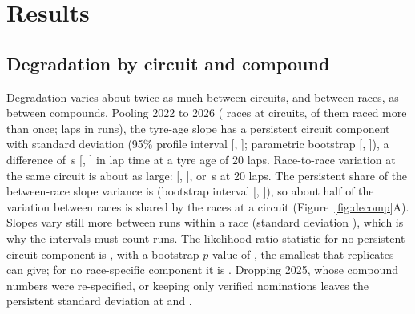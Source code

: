 \section{Results}\label{sec:results}

\subsection{Degradation by circuit and compound}\label{sec:rates}

Degradation varies about twice as much between circuits, and between races, as between compounds.
Pooling 2022 to 2026 (\PooledNEvents{} races at \PooledNCircuits{} circuits, \PooledNRepeat{} of them raced more than once; \PooledNLaps{} laps in \PooledNRuns{} runs), the tyre-age slope has a persistent circuit component with standard deviation \PersistSD\spl{} (95\% profile interval [\PersistSDLo, \PersistSDHi]; parametric bootstrap [\PersistSDBootLo, \PersistSDBootHi]), a difference of \PersistSDsPerTwenty\,s [\PersistSDsPerTwentyLo, \PersistSDsPerTwentyHi] in lap time at a tyre age of 20 laps.
Race-to-race variation at the same circuit is about as large: \EventSD\spl{} [\EventSDLo, \EventSDHi], or \EventSDsPerTwenty\,s at 20 laps.
The persistent share of the between-race slope variance is \PersistShare{} (bootstrap interval [\PersistShareBootLo, \PersistShareBootHi]), so about half of the variation between races is shared by the races at a circuit (Figure~\ref{fig:decomp}A).
Slopes vary still more between runs within a race (standard deviation \RunSlopeSD\spl), which is why the intervals must count runs.
The likelihood-ratio statistic for no persistent circuit component is \PooledLRCircuit{}, with a bootstrap $p$-value of \PooledPCircuit{}, the smallest that \PooledNBootCircuit{} replicates can give; for no race-specific component it is \PooledLREvent.
Dropping 2025, whose compound numbers were re-specified, or keeping only verified nominations leaves the persistent standard deviation at \SensNoTwentyFiveCircuitSD{} and \SensVerifiedCircuitSD\spl.

